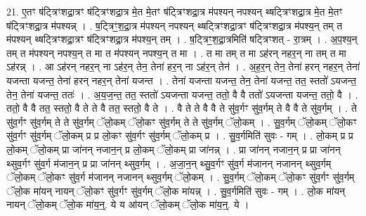 \documentclass[17pt]{extarticle}
\begin{document}
21. ए॒तꣳ ष॑ट्त्रिꣳशद्रा॒त्रꣳ ष॑ट्त्रिꣳशद्रा॒त्र मे॒त मे॒तꣳ ष॑ट्त्रिꣳशद्रा॒त्र म॑पश्यन् नपश्यन् थ्षट्त्रिꣳशद्रा॒त्र मे॒त मे॒तꣳ ष॑ट्त्रिꣳशद्रा॒त्र म॑पश्यन्न् । . ष॒ट्त्रिꣳ॒॒श॒द्रा॒त्र म॑पश्यन् नपश्यन् थ्षट्त्रिꣳशद्रा॒त्रꣳ ष॑ट्त्रिꣳशद्रा॒त्र म॑पश्य॒न् तम् त म॑पश्यन् थ्षट्त्रिꣳशद्रा॒त्रꣳ ष॑ट्त्रिꣳशद्रा॒त्र म॑पश्य॒न् तम् । . ष॒ट्त्रिꣳ॒॒श॒द्रा॒त्रमिति॑ षट्त्रिꣳशत् - रा॒त्रम् । . अ॒प॒श्य॒न् तम् त म॑पश्यन् नपश्य॒न् त मा त म॑पश्यन् नपश्य॒न् त मा । . त मा तम् त मा ऽह॑रन् नहर॒न् ना तम् त मा ऽह॑रन्न् । . आ ऽह॑रन् नहर॒न् ना ऽह॑र॒न् तेन॒ तेना॑ हर॒न् ना ऽह॑र॒न् तेन॑ । . अ॒ह॒र॒न् तेन॒ तेना॑ हरन् नहर॒न् तेना॑ यजन्ता यजन्त॒ तेना॑ हरन् नहर॒न् तेना॑ यजन्त । . तेना॑ यजन्ता यजन्त॒ तेन॒ तेना॑ यजन्त॒ तत॒ स्ततो॑ ऽयजन्त॒ तेन॒ तेना॑ यजन्त॒ ततः॑ । . अ॒य॒ज॒न्त॒ तत॒ स्ततो॑ ऽयजन्ता यजन्त॒ ततो॒ वै वै ततो॑ ऽयजन्ता यजन्त॒ ततो॒ वै । . ततो॒ वै वै तत॒ स्ततो॒ वै ते ते वै तत॒ स्ततो॒ वै ते । . वै ते ते वै वै ते सु॑व॒र्गꣳ सु॑व॒र्गम् ते वै वै ते सु॑व॒र्गम् । . ते सु॑व॒र्गꣳ सु॑व॒र्गम् ते ते सु॑व॒र्गम् ॅलो॒कम् ॅलो॒कꣳ सु॑व॒र्गम् ते ते सु॑व॒र्गम् ॅलो॒कम् । . सु॒व॒र्गम् ॅलो॒कम् ॅलो॒कꣳ सु॑व॒र्गꣳ सु॑व॒र्गम् ॅलो॒कम् प्र प्र लो॒कꣳ सु॑व॒र्गꣳ सु॑व॒र्गम् ॅलो॒कम् प्र । . सु॒व॒र्गमिति॑ सुवः - गम् । . लो॒कम् प्र प्र लो॒कम् ॅलो॒कम् प्रा जा॑नन् नजान॒न् प्र लो॒कम् ॅलो॒कम् प्रा जा॑नन्न् । . प्रा जा॑नन् नजान॒न् प्र प्रा जा॑नन् थ्सुव॒र्गꣳ सु॑व॒र्ग म॑जान॒न् प्र प्रा जा॑नन् थ्सुव॒र्गम् । . अ॒जा॒न॒न् थ्सु॒व॒र्गꣳ सु॑व॒र्ग म॑जानन् नजानन् थ्सुव॒र्गम् ॅलो॒कम् ॅलो॒कꣳ सु॑व॒र्ग म॑जानन् नजानन् थ्सुव॒र्गम् ॅलो॒कम् । . सु॒व॒र्गम् ॅलो॒कम् ॅलो॒कꣳ सु॑व॒र्गꣳ सु॑व॒र्गम् ॅलो॒क मा॑यन् नायन् ॅलो॒कꣳ सु॑व॒र्गꣳ सु॑व॒र्गम् ॅलो॒क मा॑यन्न् । . सु॒व॒र्गमिति॑ सुवः - गम् । . लो॒क मा॑यन् नायन् ॅलो॒कम् ॅलो॒क मा॑य॒न्॒. ये य आ॑यन् ॅलो॒कम् ॅलो॒क मा॑य॒न्॒. ये । \newline
\end{document}

